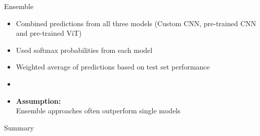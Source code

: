\documentclass{beamer}
\begin{document}
\begin{frame}{Ensemble}
    \begin{itemize}
        \item Combined predictions from all three models (Custom CNN, pre-trained CNN and pre-trained ViT)
        \item Used softmax probabilities from each model
        \item Weighted average of predictions based on test set performance
        \item[] \vspace{0.5cm}
        \item \textbf{Assumption:\\}Ensemble approaches often outperform single models~\cite{Stallkamp2012,DBLP:journals/corr/HeZRS15}
    \end{itemize}
\end{frame}

\begin{frame}{Summary}
    \begin{table}
        \caption{Model parameters and size of the custom CNN, pre-trained CNN and pre-trained ViT}
        \begin{center}
        \end{center}
    \end{table}
\end{frame}
\end{document}
